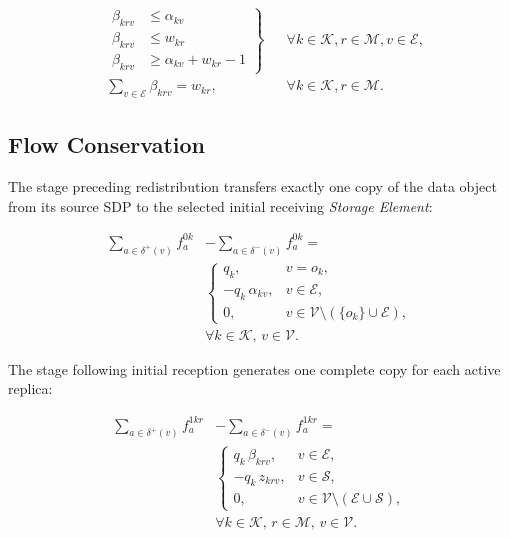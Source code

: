 \documentclass[a4paper,fleqn]{cas-dc}
\newcommand{\V}{\mathcal{V}}
\newcommand{\Eset}{\mathcal{E}}
\newcommand{\Sset}{\mathcal{S}}
\newcommand{\Kset}{\mathcal{K}}
\newcommand{\Mset}{\mathcal{M}}
\begin{document}
\begin{align}
&\left.
\begin{aligned}
\beta_{krv} &\le \alpha_{kv} \\
\beta_{krv} &\le w_{kr} \\
\beta_{krv} &\ge \alpha_{kv}+w_{kr}-1 
\end{aligned}
\right\}
&& \forall k\in\Kset, r\in\Mset, v\in\Eset,\\[1.5ex]
&\sum_{v\in\Eset} \beta_{krv} = w_{kr},
&& \forall k\in\Kset, r\in\Mset.
\end{align}


\subsection*{Flow Conservation}

The stage preceding redistribution transfers exactly one copy of the data object from its source SDP to the selected initial receiving \emph{Storage Element}:

\begin{equation}
\begin{split}
\sum_{a\in\delta^{+}(v)} f_a^{0k} &- \sum_{a\in\delta^{-}(v)} f_a^{0k} = \\
&\begin{cases}
q_k, & v = o_k,\\
-q_k\,\alpha_{kv}, & v\in\Eset,\\
0, & v\in\V\setminus(\{o_k\}\cup\Eset),
\end{cases} \\[1.5ex]
&\forall k\in\Kset,\, v\in\V.
\end{split}
\end{equation}

The stage following initial reception generates one complete copy for each active replica:

\begin{equation}
\begin{split}
\sum_{a\in\delta^{+}(v)} f_a^{1kr} &- \sum_{a\in\delta^{-}(v)} f_a^{1kr} = \\
&\begin{cases}
q_k\,\beta_{krv}, & v\in\Eset,\\
-q_k\,z_{krv}, & v\in\Sset,\\
0, & v\in\V\setminus(\Eset\cup\Sset),
\end{cases} \\[1.5ex]
&\forall k\in\Kset,\, r\in\Mset,\, v\in\V.
\end{split}
\end{equation}
\end{document}
